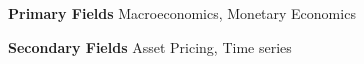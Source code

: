 

\begin{cventries}

\cventry
    {\textbf{Primary Fields}} %
    {} %
    {}
    {}
    {Macroeconomics, Monetary Economics}

    \cventry
    {\textbf{Secondary Fields}} %
    {} %
    {}
    {}
    {Asset Pricing, Time series}

\end{cventries}
